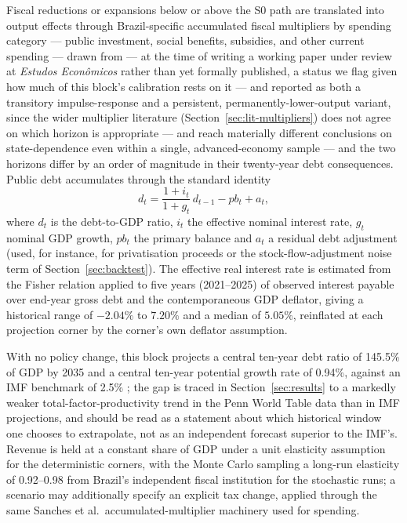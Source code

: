 \documentclass[11pt,a4paper]{article}
\begin{document}
Fiscal reductions or expansions below or above the \textsc{S0} path are translated into output effects through Brazil-specific accumulated fiscal multipliers by spending category --- public investment, social benefits, subsidies, and other current spending --- drawn from \citet{sanches2026} --- at the time of writing a working paper under review at \textit{Estudos Econ\^omicos} rather than yet formally published, a status we flag given how much of this block's calibration rests on it --- and reported as both a transitory impulse-response and a persistent, permanently-lower-output variant, since the wider multiplier literature (Section~\ref{sec:lit-multipliers}) does not agree on which horizon is appropriate --- \citet{auerbachgorodnichenko2012} and \citet{rameyzubairy2018} reach materially different conclusions on state-dependence even within a single, advanced-economy sample --- and the two horizons differ by an order of magnitude in their twenty-year debt consequences. Public debt accumulates through the standard identity
\begin{equation}
d_t = \frac{1+i_t}{1+g_t}\,d_{t-1} - pb_t + a_t,
\end{equation}
where $d_t$ is the debt-to-GDP ratio, $i_t$ the effective nominal interest rate, $g_t$ nominal GDP growth, $pb_t$ the primary balance and $a_t$ a residual debt adjustment (used, for instance, for privatisation proceeds or the stock-flow-adjustment noise term of Section~\ref{sec:backtest}). The effective real interest rate is estimated from the Fisher relation applied to five years (2021--2025) of observed interest payable over end-year gross debt and the contemporaneous GDP deflator, giving a historical range of $-2.04\%$ to $7.20\%$ and a median of $5.05\%$, reinflated at each projection corner by the corner's own deflator assumption.

With no policy change, this block projects a central ten-year debt ratio of 145.5\% of GDP by 2035 and a central ten-year potential growth rate of 0.94\%, against an IMF benchmark of 2.5\% \citep{imfweo2026}; the gap is traced in Section~\ref{sec:results} to a markedly weaker total-factor-productivity trend in the Penn World Table data than in IMF projections, and should be read as a statement about which historical window one chooses to extrapolate, not as an independent forecast superior to the IMF's. Revenue is held at a constant share of GDP under a unit elasticity assumption for the deterministic corners, with the Monte Carlo sampling a long-run elasticity of 0.92--0.98 from Brazil's independent fiscal institution \citep{ifi2021ee16} for the stochastic runs; a scenario may additionally specify an explicit tax change, applied through the same Sanches et al.\ accumulated-multiplier machinery used for spending.
\end{document}
